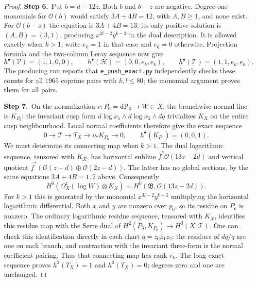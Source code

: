 \documentclass[11pt,a4paper]{article}
\theoremstyle{plain}
\theoremstyle{definition}
\begin{document}
\begin{proof}
\par\smallskip\noindent\textbf{Step 6.}\ Put $b=d-12z$.  Both $b$ and $b-z$ are negative.
Degree-one monomials for $\mathcal O(b)$ would satisfy
$3A+4B=12$, with $A,B\ge1$, and none exist.
For $\mathcal O(b-z)$ the equation is $3A+4B=13$;
its only positive solution is $(A,B)=(3,1)$, producing
$x^{3l-2}y^{k-2}$ in the dual description.  It is allowed
exactly when $k>1$; write $e_k=1$ in that case and $e_k=0$
otherwise.  Projection formula and the two-column Leray sequence
now give
\[
 h^\bullet(\mathcal V)=(1,1,0,0),\qquad
 h^\bullet(\mathcal H)=(0,0,e_k,e_k),\qquad
 h^\bullet(\mathcal T)=(1,1,e_k,e_k).
\]
The producing run reports that \texttt{e\_push\_exact.py} independently checks these
counts for all $1965$ coprime pairs with $k,l\le80$; the monomial
argument proves them for all pairs.

\par\smallskip\noindent\textbf{Step 7.}\ On the normalization $\nu:P_6=\mathrm{dP}_6\to W\subset X$,
the branchwise normal line is $K_{P_6}$: the invariant cusp form
$d\log x_1\wedge d\log x_2\wedge dq$ trivializes $K_X$
on the entire cusp neighbourhood.  Local normal coefficients
therefore give the exact sequence
\[
 0\longrightarrow\mathcal T\longrightarrow T_X
 \longrightarrow\nu_*K_{P_6}\longrightarrow0,
 \qquad h^\bullet(K_{P_6})=(0,0,1).
\]
We must determine its connecting map when $k>1$.
The dual logarithmic sequence, tensored with $K_X$, has horizontal
subline $\bar f^*\mathcal O(13z-2d)$ and vertical quotient
$\bar f^*(\mathcal O(z-d)\oplus\mathcal O(2z-d))$.
The latter has no global sections, by the same equations
$3A+4B=1,2$ above.  Consequently
\[
 H^0(\Omega_X^1(\log W)\otimes K_X)
 =H^0(\mathfrak B,\mathcal O(13z-2d)).
\]
For $k>1$ this is generated by the monomial
$x^{3l-2}y^{k-2}$ multiplying the horizontal logarithmic
differential.  Both $x$ and $y$ are nonzero over $p_0$, so its
residue on $P_6$ is nonzero.  The ordinary logarithmic residue
sequence, tensored with $K_X$, identifies this residue map with
the Serre dual of
$H^2(P_6,K_{P_6})\to H^3(X,\mathcal T)$.
One can check this identification directly in each chart
$q=z_0z_1z_2$: the residues of $dq/q$ are one on each branch,
and contraction with the invariant three-form is the normal
coefficient pairing.  Thus that connecting map has rank $e_k$.
The long exact sequence proves $h^2(T_X)=1$ and $h^3(T_X)=0$;
degrees zero and one are unchanged.


\end{proof}
\end{document}
